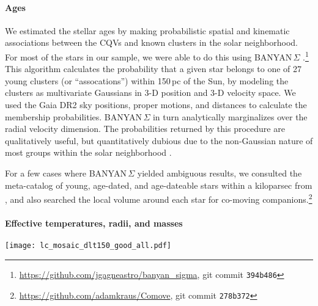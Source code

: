\documentclass[11pt,twocolumn,tighten]{aastex63}
\begin{document}
\paragraph{Ages}
We estimated the stellar ages by making probabilistic spatial and
kinematic associations between the CQVs and known clusters in the
solar neighborhood.  For most of the stars in our sample, we were able
to do this using BANYAN\,$\Sigma$
\citep{2018ApJ...856...23G}.\footnote{\url{https://github.com/jgagneastro/banyan_sigma},
git commit \texttt{394b486}} This algorithm calculates the probability
that a given star belongs to one of 27 young clusters (or
``assocations'') within 150\,pc of the Sun, by modeling the clusters
as multivariate Gaussians in 3-D position and 3-D velocity space.  We
used the Gaia DR2 sky positions, proper motions, and distances to
calculate the membership probabilities.  BANYAN\,$\Sigma$ in turn
analytically marginalizes over the radial velocity dimension.  The
probabilities returned by this procedure are qualitatively useful, but
quantitatively dubious due to the non-Gaussian nature of most groups
within the solar neighborhood \citep[see
e.g.][Figure~10]{2021ApJ...917...23K}.

For a few cases where BANYAN\,$\Sigma$ yielded ambiguous results, we
consulted the meta-catalog of young, age-dated, and age-dateable stars
within a kiloparsec from \citet{2022AJ....163..121B}, and also
searched the local volume around each star for co-moving
companions.\footnote{\url{https://github.com/adamkraus/Comove}, git
commit \texttt{278b372}}


\paragraph{Effective temperatures, radii, and masses}


\begin{figure*}[!t]
	\begin{center}
		\centering
		\texttt{[image: lc\_mosaic\_dlt150\_good\_all.pdf]}
		\caption{
			{\bf CQVs from a search of the TESS 2-minute data at
				$d$$<$150\,pc, acquired between July~2018 and Sep~2022.}
			Phased TESS light curves over 1 month are shown for 40 CQVs;
			they include the brightest and closest examples of CQVs known
			($V$=14; $J$=9.5; $d$=25\,pc).  Gray are raw 2-minute data;
			black bins to 300 points per cycle.  Periods in hours are listed
			in the lower right corners of each panel.
			{\bf todo:  add TIC IDs and sector numbers}.
		}
		\label{fig:singlemosaic}
	\end{center}
\end{figure*}
\end{document}
